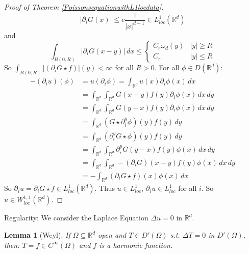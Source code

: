 \documentclass{report}
\theoremstyle{tommy}
\newtheorem{lem}[defn]{Lemma}
\begin{document}
\begin{proof}[Proof of Theorem \ref{PoissonsequationwithL1locdata}]
    \[|\partial_i G(x)| \le c \frac{1}{|x|^{d-1}} \in L_{loc}^1(\mathbb{R}^d)\]
    and
    \[\int_{B(0,R)} |\partial_i G(x-y)| \, dx \le \begin{cases}
      C_r \omega_d(y) & |y| \ge R \\ C_r & |y| \le R
    \end{cases}\]
    So \(\int_{B(0,R)} |(\partial_i G\star f)|(y) < \infty\) for all \(R > 0\). For all \(\phi \in D(\mathbb{R}^d)\): 
    \begin{align*}
      -(\partial_i u)(\phi) 
      &= u(\partial_i \phi)
      = \int_{\mathbb{R}^d} u(x) \partial_i \phi(x) \, dx \\
      &= \int_{\mathbb{R}^d} \int_{\mathbb{R}^d} G(x-y) f(y) \partial_i \phi(x) \, dx \, dy \\
      &= \int_{\mathbb{R}^d} \int_{\mathbb{R}^d} G(y-x) f(y) \partial_i \phi(x) \, dx \, dy \\
      &= \int_{\mathbb{R}^d} (G \star \partial_i^y \phi)(y) f(y) \, dy \\
      &= \int_{\mathbb{R}^d}(\partial_i^y G \star \phi)(y) f(y) \, dy \\
      &= \int_{\mathbb{R}^d} \int_{\mathbb{R}^d} \partial_i^y G(y-x) f(y) \phi(x) \, dx \, dy \\
      &= \int_{\mathbb{R}^d} \int_{\mathbb{R}^d} -(\partial_i G)(x-y) f(y) \phi(x) \, dx \, dy \\
      &= - \int_{\mathbb{R}^d} (\partial_i G \star f)(x) \phi(x) \, dx
    \end{align*}
    So \(\partial_i u = \partial_i G \star f \in L_{loc}^1(\mathbb{R}^d)\). Thus \(u \in L_{loc}^1\), \(\partial_i u \in L_{loc}^1\) for all \(i\). So \(u \in W_{loc}^{1,1}(\mathbb{R}^d)\).
  \end{proof}

  Regularity: We consider the Laplace Equation \(\Delta u = 0\) in \(\mathbb{R}^d\).

  
  \begin{lem}[Weyl]\label{weyl}
    If \(\Omega \subseteq \mathbb{R}^d\) open and \(T \in D'(\Omega)\) s.t. \(\Delta T = 0\) in \(D'(\Omega)\), then: \(T = f \in C^\infty(\Omega)\) and \(f\) is a harmonic function.
  \end{lem}
\end{document}

